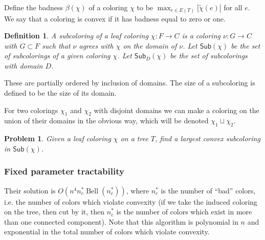 \documentclass{amsart}
\newcommand{\col}{\chi}
\newcommand{\colt}{\tilde{\chi}}
\newcommand{\subcolS}{\mathsf{Sub}}
\newcommand{\bad}{\beta}
\newcommand{\Bell}{\operatorname{Bell}}
\newcommand{\nbadcolors}{n_c^*}
\newtheorem{prop}{Proposition}
\newtheorem{problem}{Problem}
\newtheorem{defn}{Definition}
\begin{document}
Define the badness $\bad(\col)$ of a coloring $\col$ to be $\max_{e \in E(T)} |\colt(e)| $ for all $e$.
We say that a coloring is convex if it has badness equal to zero or one.

\begin{defn}
  A subcoloring of a leaf coloring $\chi: F \rightarrow C$ is a coloring $\nu: G \rightarrow C$ with $G \subset F$ such that $\nu$ agrees with $\col$ on the domain of $\nu$.
  Let $\subcolS(\col)$ be the set of subcolorings of a given coloring $\col$.
  Let $\subcolS_D(\col)$ be the set of subcolorings with domain $D$.
\end{defn}
These are partially ordered by inclusion of domains.
The size of a subcoloring is defined to be the size of its domain.

For two colorings $\col_1$ and $\col_2$ with disjoint domains we can make a coloring on the union of their domains in the obvious way, which will be denoted $\col_1 \sqcup \col_2$.

\begin{problem}
\label{prob:subcolor}
  Given a leaf coloring $\col$ on a tree $T$, find a largest convex subcoloring in $\subcolS(\col)$.
\end{problem}

%
%

\subsubsection{Fixed parameter tractability}
Their solution is $O(n^4 \nbadcolors \Bell(\nbadcolors))$, where $\nbadcolors$ is the number of ``bad'' colors, i.e. the number of colors which violate convexity (if we take the induced coloring on the tree, then cut by it, then $\nbadcolors$ is the number of colors which exist in more than one connected component).
Note that this algorithm is polynomial in $n$ and exponential in the total number of colors which violate convexity.
\end{document}

